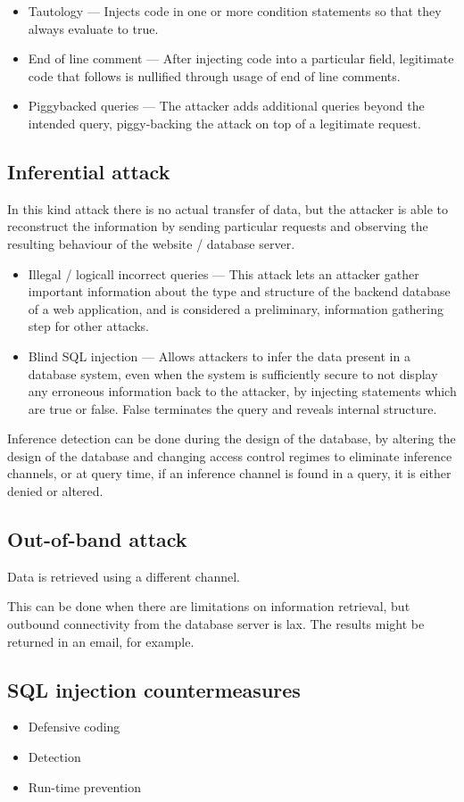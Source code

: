 \begin{itemize}
    \item Tautology --- Injects code in one or more condition statements so that they always evaluate to true.
    \item End of line comment --- After injecting code into a particular field, legitimate code that follows is nullified through usage of end of line comments.
    \item Piggybacked queries --- The attacker adds additional queries beyond the intended query, piggy-backing the attack on top of a legitimate request.
\end{itemize}

\subsection{Inferential attack}
In this kind attack there is no actual transfer of data, but the attacker is able to reconstruct
the information by sending particular requests and observing the resulting behaviour of the website / database server.

\begin{itemize}
    \item Illegal / logicall incorrect queries --- This attack lets an attacker gather important information about the type and structure of the backend database of a web application, and is considered a preliminary, information gathering step for other attacks.
    \item Blind SQL injection --- Allows attackers to infer the data present in a database system, even when the system is sufficiently secure to not display any erroneous information back to the attacker, by injecting statements which are true or false. False terminates the query and reveals internal structure.
\end{itemize}

Inference detection can be done during the design of the database, by altering the design of the database and changing access control regimes to eliminate
inference channels, or at query time, if an inference channel is found in a query, it is either denied or altered.

\subsection{Out-of-band attack}
Data is retrieved using a different channel.

This can be done when there are limitations on information retrieval, but outbound connectivity
from the database server is lax. The results might be returned in an email, for example.

\subsection{SQL injection countermeasures}
\begin{itemize}
    \item Defensive coding
    \item Detection
    \item Run-time prevention
\end{itemize}

